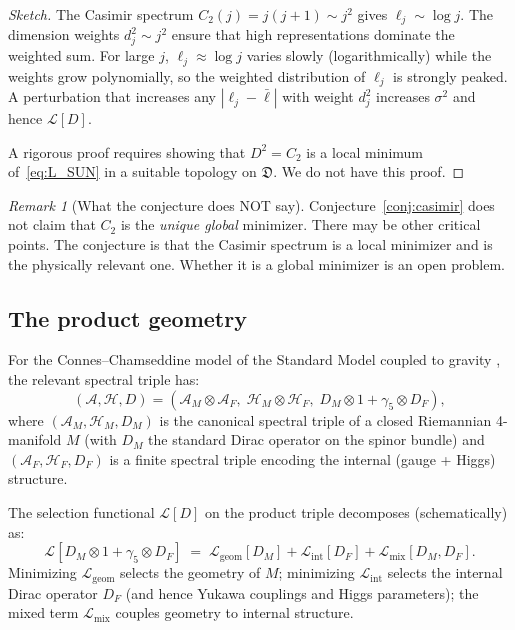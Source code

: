 \documentclass[12pt]{article}
\theoremstyle{definition}
\theoremstyle{remark}
\newtheorem{remark}[theorem]{Remark}
\begin{document}
\begin{proof}[Sketch]
The Casimir spectrum $C_2(j) = j(j+1) \sim j^2$ gives
$\ell_j \sim \log j$.  The dimension weights $d_j^2 \sim j^2$ ensure
that high representations dominate the weighted sum.  For large $j$,
$\ell_j \approx \log j$ varies slowly (logarithmically) while the
weights grow polynomially, so the weighted distribution of
$\ell_j$ is strongly peaked.  A perturbation that increases any
$|\ell_j - \bar\ell|$ with weight $d_j^2$ increases $\sigma^2$ and
hence $\mathcal{L}[D]$.

A rigorous proof requires showing that $D^2 = C_2$ is a local
minimum of~\eqref{eq:L_SUN} in a suitable topology on
$\mathfrak{D}$.  We do not have this proof.
\end{proof}

\begin{remark}[What the conjecture does NOT say]
Conjecture~\ref{conj:casimir} does not claim that $C_2$ is the
\emph{unique global} minimizer.  There may be other critical points.
The conjecture is that the Casimir spectrum is a local minimizer
and is the physically relevant one.  Whether it is a global minimizer
is an open problem.
\end{remark}

\subsection{The product geometry}

For the Connes--Chamseddine model of the Standard Model coupled to
gravity \cite{ConnesChamseddine1997,CCM2007}, the relevant spectral
triple has:
\begin{equation}\label{eq:product}
  (\mathcal{A},\mathcal{H},D)
  = (\mathcal{A}_M \otimes \mathcal{A}_F,\;
     \mathcal{H}_M \otimes \mathcal{H}_F,\;
     D_M \otimes 1 + \gamma_5 \otimes D_F),
\end{equation}
where $(\mathcal{A}_M, \mathcal{H}_M, D_M)$ is the canonical spectral
triple of a closed Riemannian 4-manifold $M$ (with $D_M$ the standard
Dirac operator on the spinor bundle) and
$(\mathcal{A}_F, \mathcal{H}_F, D_F)$ is a finite spectral triple
encoding the internal (gauge + Higgs) structure.

The selection functional $\mathcal{L}[D]$ on the product triple
decomposes (schematically) as:
\begin{equation}\label{eq:L_product}
  \mathcal{L}[D_M \otimes 1 + \gamma_5 \otimes D_F]
  \;=\; \mathcal{L}_{\mathrm{geom}}[D_M]
     + \mathcal{L}_{\mathrm{int}}[D_F]
     + \mathcal{L}_{\mathrm{mix}}[D_M, D_F].
\end{equation}
Minimizing $\mathcal{L}_{\mathrm{geom}}$ selects the geometry of $M$;
minimizing $\mathcal{L}_{\mathrm{int}}$ selects the internal Dirac
operator $D_F$ (and hence Yukawa couplings and Higgs parameters);
the mixed term $\mathcal{L}_{\mathrm{mix}}$ couples geometry to
internal structure.
\end{document}
